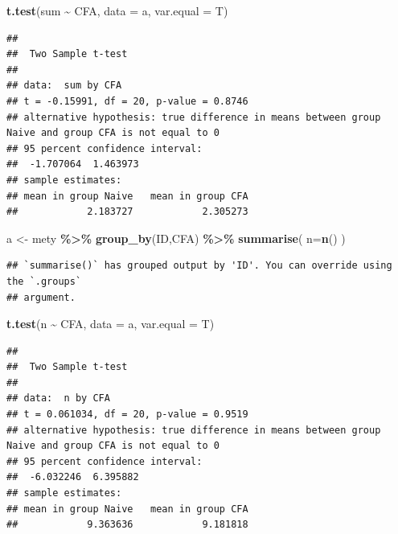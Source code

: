 \documentclass[
]{book}
\newenvironment{Shaded}{\begin{snugshade}}{\end{snugshade}}
\newcommand{\AttributeTok}[1]{\textcolor[rgb]{0.13,0.29,0.53}{#1}}
\newcommand{\FunctionTok}[1]{\textcolor[rgb]{0.13,0.29,0.53}{\textbf{#1}}}
\newcommand{\NormalTok}[1]{#1}
\newcommand{\OtherTok}[1]{\textcolor[rgb]{0.56,0.35,0.01}{#1}}
\newcommand{\SpecialCharTok}[1]{\textcolor[rgb]{0.81,0.36,0.00}{\textbf{#1}}}
\begin{document}
\begin{Shaded}
\begin{Highlighting}[]
\FunctionTok{t.test}\NormalTok{(sum }\SpecialCharTok{\textasciitilde{}}\NormalTok{ CFA, }\AttributeTok{data =}\NormalTok{ a, }\AttributeTok{var.equal =}\NormalTok{ T)}
\end{Highlighting}
\end{Shaded}

\begin{verbatim}
## 
##  Two Sample t-test
## 
## data:  sum by CFA
## t = -0.15991, df = 20, p-value = 0.8746
## alternative hypothesis: true difference in means between group Naive and group CFA is not equal to 0
## 95 percent confidence interval:
##  -1.707064  1.463973
## sample estimates:
## mean in group Naive   mean in group CFA 
##            2.183727            2.305273
\end{verbatim}

\begin{Shaded}
\begin{Highlighting}[]
\NormalTok{a }\OtherTok{\textless{}{-}}\NormalTok{ mety }\SpecialCharTok{\%\textgreater{}\%}
  \FunctionTok{group\_by}\NormalTok{(ID,CFA) }\SpecialCharTok{\%\textgreater{}\%}
  \FunctionTok{summarise}\NormalTok{(}
    \AttributeTok{n=}\FunctionTok{n}\NormalTok{()}
\NormalTok{  )}
\end{Highlighting}
\end{Shaded}

\begin{verbatim}
## `summarise()` has grouped output by 'ID'. You can override using the `.groups`
## argument.
\end{verbatim}

\begin{Shaded}
\begin{Highlighting}[]
\FunctionTok{t.test}\NormalTok{(n }\SpecialCharTok{\textasciitilde{}}\NormalTok{ CFA, }\AttributeTok{data =}\NormalTok{ a, }\AttributeTok{var.equal =}\NormalTok{ T)}
\end{Highlighting}
\end{Shaded}

\begin{verbatim}
## 
##  Two Sample t-test
## 
## data:  n by CFA
## t = 0.061034, df = 20, p-value = 0.9519
## alternative hypothesis: true difference in means between group Naive and group CFA is not equal to 0
## 95 percent confidence interval:
##  -6.032246  6.395882
## sample estimates:
## mean in group Naive   mean in group CFA 
##            9.363636            9.181818
\end{verbatim}
\end{document}
